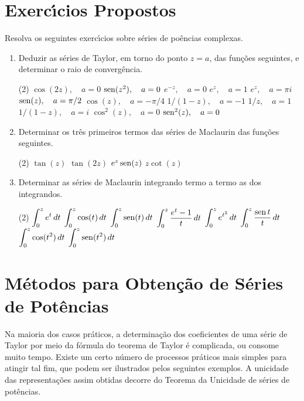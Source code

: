 \section*{Exerc\'{\i}cios Propostos} 
Resolva os seguintes exerc\'{\i}cios sobre s\'{e}ries de po\^{e}ncias complexas.
\begin{enumerate}[label=\rm{(\arabic*)},ref=\rm{(\arabic*)}]
\item Deduzir as s\'{e}ries de Taylor, em torno do ponto $z = a$, das
fun\c{c}\~{o}es seguintes, e determinar o raio de converg\^{e}ncia.
\begin{tasks}[label=\rm{(\alph*)},item-indent=3em,label-width=4ex,ref=\rm{(\alph*)}](2)
\task \(\cos(2z), \quad   a = 0 \)
\task \(\operatorname{sen}(z^2),\quad a = 0\)
\task \(e^{-z},\quad  a = 0 \)
\task \(e^z,\quad a = 1\)
\task \(e^z,\quad a= \pi i\)
\task \(\operatorname{sen}(z),\quad  a= \pi/2\)
\task \(\cos(z),\quad  a = - \pi/4\)
\task  \(1/(1-z),\quad   a =-1\)
\task \(1/z,\quad   a = 1\)
\task \(1/(1 - z),\quad   a = i\)
\task \(\cos^2(z),\quad   a = 0\)
\task \(\operatorname{sen}^2(z),\quad   a =0\)
\end{tasks}
\item Determinar os tr\^{e}s primeiros termos das s\'{e}ries de Maclaurin
das fun\c{c}\~{o}es seguintes.
\begin{tasks}[label=\rm{(\alph*)},item-indent=3em,label-width=4ex,ref=\rm{(\alph*)}](2)
\task \(\tan(z)\)
\task \(\tan(2z)\)
\task \(e^z \operatorname{sen}(z)\)
\task \(z \cot(z)\)
\end{tasks}
\item Determinar as s\'{e}ries de Maclaurin integrando termo a termo as
dos integrandos.
\begin{tasks}[label=\rm{(\alph*)},item-indent=3em,label-width=4ex,ref=\rm{(\alph*)}](2)
\task  \(\displaystyle{\int_0^z e^t\, dt}\)
\task \(\displaystyle{\int_0^z \cos(t)\, dt}\)
\task \(\displaystyle{\int_0^z \operatorname{sen}(t)\, dt}\)
\task \(\displaystyle{\int_0^z \frac{e^t-1}{t}\, dt}\)
\task \(\displaystyle{\int_0^z e^{t^2}\,dt}\)
\task \(\displaystyle{\int_0^z \frac{\operatorname{sen}t}{t}\, dt}\)
\task \(\displaystyle{\int_0^z \cos(t^2)\, dt}\)
\task \(\displaystyle{\int_0^z \operatorname{sen}(t^2)\, dt}\)
\end{tasks}
\end{enumerate}

\section{M\'{e}todos para Obten\c{c}\~{a}o de S\'{e}ries de Pot\^{e}ncias}
Na maioria dos casos pr\'{a}ticos, a determina\c{c}\~{a}o dos coeficientes de
uma s\'{e}rie de Taylor por meio da f\'{o}rmula do teorema de Taylor \'{e}
complicada, ou consome muito tempo. Existe um certo n\'{u}mero de
processos pr\'{a}ticos mais simples para atingir tal fim, que podem
ser ilustrados pelos seguintes exemplos. A unicidade das
representa\c{c}\~{o}es assim obtidas decorre do Teorema da Unicidade de
s\'{e}ries de pot\^{e}ncias.

